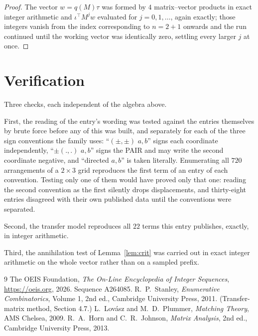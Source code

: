 \documentclass[11pt,a4paper]{article}
\theoremstyle{plain}
\theoremstyle{definition}
\begin{document}
\begin{proof}
The vector $w=q(M)\tau$ was formed by $4$ matrix--vector products in exact integer
arithmetic and $\iota^{\!\top}M^{j}w$ evaluated for $j=0,1,\dots$, again exactly; those
integers vanish from the index corresponding to $n=2+1$ onwards and the run continued
until the working vector was identically zero, settling every larger $j$ at once.
\end{proof}

\section{Verification}

Three checks, each independent of the algebra above.

First, the reading of the entry's wording was tested against the entries themselves by brute
force before any of this was built, and separately for each of the three sign conventions the
family uses: ``$(\pm,\pm)$ $a,b$'' signs each coordinate independently, ``$\pm(.,.)$ $a,b$''
signs the PAIR and may write the second coordinate negative, and ``directed $a,b$'' is taken
literally. Enumerating all $720$ arrangements of a $2\times3$ grid reproduces the first term
of an entry of each convention. Testing only one of them would have proved only that one:
reading the second convention as the first silently drops displacements, and thirty-eight
entries disagreed with their own published data until the conventions were separated.

Second, the transfer model reproduces all $22$ terms this entry publishes, exactly, in
integer arithmetic.

Third, the annihilation test of Lemma~\ref{lem:crit} was carried out in exact integer
arithmetic on the whole vector rather than on a sampled prefix.

\begin{thebibliography}{9}
 The OEIS Foundation, \emph{The On-Line Encyclopedia of Integer
Sequences}, \url{https://oeis.org}, 2026. Sequence A264085.
 R.~P.~Stanley, \emph{Enumerative Combinatorics}, Volume 1, 2nd ed.,
Cambridge University Press, 2011. (Transfer-matrix method, Section 4.7.)
 L.~Lov\'asz and M.~D.~Plummer, \emph{Matching Theory}, AMS Chelsea, 2009.
 R.~A.~Horn and C.~R.~Johnson, \emph{Matrix Analysis}, 2nd ed., Cambridge
University Press, 2013.
\end{thebibliography}
\end{document}
